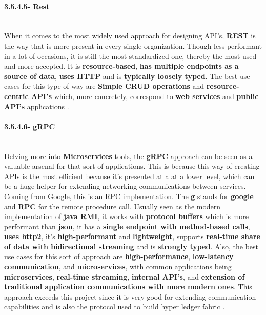 \paragraph{3.5.4.5- Rest}\mbox{}\\
When it comes to the most widely used approach for designing API's, \textbf{REST} is the way that is more present in every single
organization. Though less performant in a lot of occasions, it is still the most standardized one, thereby the most used and more 
accepted. It is \textbf{resource-based}, \textbf{has multiple endpoints as a source of data}, \textbf{uses HTTP} 
and is \textbf{typically loosely typed}. The best use cases for this type of way are \textbf{Simple CRUD operations} and 
\textbf{resource-centric API's} which, more concretely, correspond to \textbf{web services} and \textbf{public API's} 
applications \cite{rest}.


\paragraph{3.5.4.6- gRPC}\mbox{}\\
Delving more into \textbf{Microservices} tools, the \textbf{gRPC} approach can be seen as a valuable arsenal for that sort of applications. 
This is because this way of creating APIs is the most efficient because it's presented at a at a lower level, which can be a huge helper 
for extending networking communications between services. Coming from Google, this is an RPC implementation. The \textbf{g} stands 
for \textbf{google} and \textbf{RPC} for the remote procedure call. Usually seen as the modern implementation of \textbf{java RMI}, 
it works with \textbf{protocol buffers} which is more performant than \textbf{json}, it has a \textbf{single endpoint with method-based calls}, 
\textbf{uses http2}, it's \textbf{high-performant} and \textbf{lightweight}, supports \textbf{real-time share of data with bidirectional 
streaming} and is \textbf{strongly typed}. Also, the best use cases for this sort of approach are \textbf{high-performance}, 
\textbf{low-latency communication}, and \textbf{microservices}, with common applications being \textbf{microservices}, 
\textbf{real-time streaming}, \textbf{internal API's}, and \textbf{extension of traditional application communications with more 
modern ones}. This approach exceeds this project since it is very good for extending communication capabilities and is also 
the protocol used to build hyper ledger fabric \cite{grpc}\cite{grpc2}.

